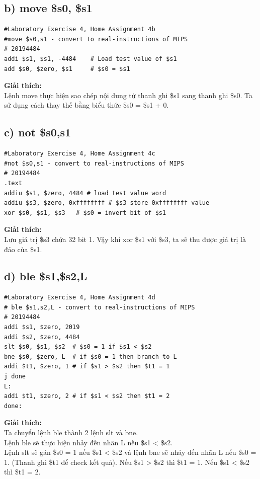 \documentclass[12pt,a4paper,oneside]{article}
\begin{document}
	\subsection*{b) move \$s0, \$s1}
	\begin{center}
	\begin{lstlisting}
#Laboratory Exercise 4, Home Assignment 4b
#move $s0,s1 - convert to real-instructions of MIPS
# 20194484
addi $s1, $s1, -4484	# Load test value of $s1
add $s0, $zero, $s1		# $s0 = $s1

	\end{lstlisting}
	\end{center}
	\textbf{Giải thích:\\}
	Lệnh move thực hiện sao chép nội dung từ thanh ghi \$s1 sang thanh ghi \$s0. Ta sử dụng cách thay thế bằng biểu thức \$s0 = \$s1 + 0.
	
	\subsection*{c) not \$s0,s1}
	\begin{center}
	\begin{lstlisting}
#Laboratory Exercise 4, Home Assignment 4c
#not $s0,s1 - convert to real-instructions of MIPS
# 20194484
.text
addiu $s1, $zero, 4484 # load test value word
addiu $s3, $zero, 0xffffffff # $s3 store 0xffffffff value
xor $s0, $s1, $s3	# $s0 = invert bit of $s1

	\end{lstlisting}
	\end{center}
	\textbf{Giải thích:\\}
	Lưu giá trị \$s3 chứa 32 bit 1. Vậy khi xor \$s1 với \$s3, ta sẽ thu được giá trị là đảo của \$s1.
	
	\subsection*{d) ble \$s1,\$s2,L}
	\begin{center}
	\begin{lstlisting}
#Laboratory Exercise 4, Home Assignment 4d
# ble $s1,s2,L - convert to real-instructions of MIPS
# 20194484
addi $s1, $zero, 2019
addi $s2, $zero, 4484
slt $s0, $s1, $s2  # $s0 = 1 if $s1 < $s2
bne $s0, $zero, L  # if $s0 = 1 then branch to L 
addi $t1, $zero, 1 # if $s1 > $s2 then $t1 = 1
j done
L:
addi $t1, $zero, 2 # if $s1 < $s2 then $t1 = 2
done:

	\end{lstlisting}
	\end{center}
	\textbf{Giải thích:\\}
	Ta chuyển lệnh ble thành 2 lệnh slt và bne.\\
	Lệnh ble sẽ thực hiện nhảy đến nhãn L nếu \$s1 < \$s2.\\
	Lệnh slt sẽ gán \$s0 = 1 nếu \$s1 < \$s2 và lệnh bne sẽ nhảy đến nhãn L nếu \$s0 = 1. (Thanh ghi \$t1 để check kết quả). Nếu \$s1 > \$s2 thì \$t1 = 1. Nếu \$s1 < \$s2 thì \$t1 = 2.
	
\end{document}
